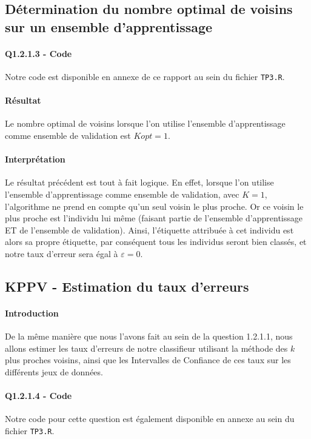 \documentclass{report}
\begin{document}
\subsection{Détermination du nombre optimal de voisins sur un ensemble d'apprentissage}
\paragraph{Q1.2.1.3 - Code}
Notre code est disponible en annexe de ce rapport au sein du fichier \verb+TP3.R+.

\paragraph{Résultat}
Le nombre optimal de voisins lorsque l'on utilise l'ensemble d'apprentissage comme ensemble de validation est $Kopt = 1$.

\paragraph{Interprétation}
Le résultat précédent est tout à fait logique. En effet, lorsque l'on utilise l'ensemble d'apprentissage comme ensemble de validation, avec $K = 1$, l'algorithme ne prend en compte qu'un seul voisin le plus proche. Or ce voisin le plus proche est l'individu lui même (faisant partie de l'ensemble d'apprentissage ET de l'ensemble de validation). Ainsi, l'étiquette attribuée à cet individu est alors sa propre étiquette, par conséquent tous les individus seront bien classés, et notre taux d'erreur sera égal à $\varepsilon = 0$.

\subsection{KPPV - Estimation du taux d'erreurs}
\paragraph{Introduction}
De la même manière que nous l'avons fait au sein de la question 1.2.1.1, nous allons estimer les taux d'erreurs de notre classifieur utilisant la méthode des $k$ plus proches voisins, ainsi que les Intervalles de Confiance de ces taux sur les différents jeux de données.

\paragraph{Q1.2.1.4 - Code}
Notre code pour cette question est également disponible en annexe au sein du fichier \verb+TP3.R+.
\end{document}
